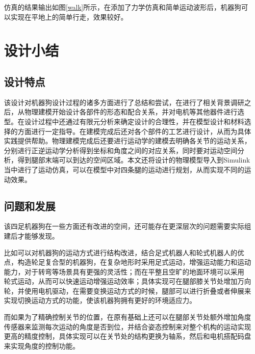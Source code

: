 \documentclass[10pt]{article}
\begin{document}
仿真的结果输出如图\ref{walk}所示，在添加了力学仿真和简单运动波形后，机器狗可以实现在平地上的简单行走，效果较好。

\section{设计小结}
\subsection{设计特点}
该设计对机器狗设计过程的诸多方面进行了总结和尝试，在进行了相关背景调研之后，从物理建模开始设计各部件的形态和配合关系，并对电机等其他器件进行选型。在设计过程中还通过有限元分析来确定设计的合理性，并在模型设计和材料选择的方面进行一定指导。在建模完成后还对各个部件的工艺进行设计，从而为具体实践提供帮助。物理建模完成后还要进行运动学的建模去明确各关节的运动关系，分别进行正逆运动学分析得到坐标和角度之间的对应关系，同时要对运动空间分析，得到腿部末端可以到达的空间区域。本文还将设计的物理模型导入到Simulink当中进行了运动仿真，可以在模型中对四条腿的运动进行规划，从而实现不同的运动效果。


\subsection{问题和发展}
该四足机器狗在一些方面还有改进的空间，还可能存在更深层次的问题需要实际组建后才能够发现。

比如可以对机器狗的运动方式进行结构改进，结合足式机器人和轮式机器人的优点，构造轮足复合型的机器狗，在复杂地形时采用足式运动，增强运动能力和运动能力，对于转弯等场景具有更强的灵活性；而在平整且空旷的地面环境可以采用
轮式运动，从而可以快速运动增强运动效率；具体实现可在腿部膝关节处增加万向轮，并使用电机驱动，在需要变换运动方式的时候，腿部可以进行折叠或者伸展来实现切换运动方式的功能，使该机器狗拥有更好的环境适应力。

而如果为了精确控制关节的位置，在原有基础上还可以在腿部关节处额外增加角度传感器来监测每次运动的角度是否到位，并结合姿态控制来对整个机构的运动实现更高的精度控制，具体实现可以在关节处的结构更换为轴系，然后和电机搭配码盘来实现角度的控制功能。

\newpage
\renewcommand\bibname{参考文献}
\renewcommand\refname{参考文献}


\nocite{*}                  %
\end{document}
